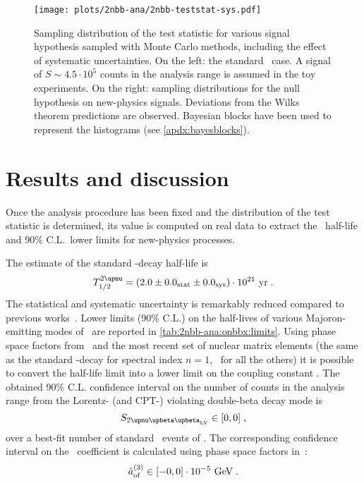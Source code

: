 \begin{figure}
  \centering
  \texttt{[image: plots/2nbb-ana/2nbb-teststat-sys.pdf]}
  \caption{%
    Sampling distribution of the test statistic for various signal hypothesis sampled with
    Monte Carlo methods, including the effect of systematic uncertainties. On the left:
    the standard \nnbb\ case. A signal of $S \sim 4.5 \cdot 10^5$ counts in the analysis
    range is assumed in the toy experiments. On the right: sampling distributions for the
    null hypothesis on new-physics signals.  Deviations from the Wilks theorem predictions
    are observed. Bayesian blocks have been used to represent the histograms (see
    \cref{apdx:bayesblocks}). 
  }\label{fig:2nbb-ana:ts-dist-sys}
\end{figure}

\begin{table}
  \centering
  \caption{%
    Summary of the systematic uncertainties affecting the \nnbb\ distribution analysis.
    For brevity, only results for the ordinary \nnbb\ half-life estimate and the \onbbx\
    ($n=1$) 90\% C.L.~lower limit are reported.
  }\label{tab:2nbb-ana:systematics}
  
\end{table}

\section{Results and discussion}%
\label{sec:2nbb-ana:results}

Once the analysis procedure has been fixed and the distribution of the test statistic is
determined, its value is computed on real data to extract the \nnbb\ half-life and 90\%
C.L.~lower limits for new-physics processes.

The estimate of the standard \nnbb-decay half-life is
\[
  \thalftwoM = (2.0 \pm \stat{0.0} \pm \syst{0.0}) \cdot 10^{21}~\text{yr} \;.
\]
The statistical and systematic uncertainty is remarkably reduced compared to previous
works~\cite{Agostini2015a}.
\newpar
Lower limits (90\% C.L.) on the half-lives of various Majoron-emitting modes of \onbb\ are
reported in \cref{tab:2nbb-ana:onbbx:limits}. Using phase space factors
from~\cite{Kotila2015} and the most recent set of nuclear matrix elements (the same as the
standard \onbb-decay for spectral index $n=1$,~\cite{Hirsch1995} for all the others) it is
possible to convert the half-life limit into a lower limit on the coupling constant \ga.
\newpar
The obtained 90\% C.L. confidence interval on the number of counts in the analysis range
from the Lorentz- (and CPT-) violating double-beta decay mode is
\[
  S_\nnbblvM \in [0,0] \;,
\]
over a best-fit number of standard \nnbb\ events of . The corresponding
confidence interval on the \aof\ coefficient is calculated using phase space factors
in~\cite{Nitescu2020}:
\[
  {\mathring{a}_\text{of}^{(3)}} \in [-0, 0] \cdot 10^{-5}~\text{GeV} \;.
\]

